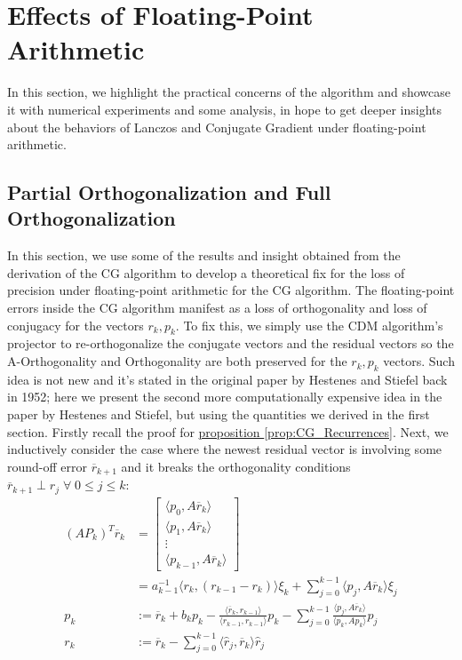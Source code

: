 \documentclass[]{article}
\theoremstyle{definition}
\begin{document}
\section{Effects of Floating-Point Arithmetic}
    In this section, we highlight the practical concerns of the algorithm and showcase it with numerical experiments and some analysis, in hope to get deeper insights about the behaviors of Lanczos and Conjugate Gradient under floating-point arithmetic. 
    \subsection{Partial Orthogonalization and Full Orthogonalization}
        In this section, we use some of the results and insight obtained from the derivation of the CG algorithm to develop a theoretical fix for the loss of precision under floating-point arithmetic for the CG algorithm. The floating-point errors inside the CG algorithm manifest as a loss of orthogonality and loss of conjugacy for the vectors $r_k, p_k$. To fix this, we simply use the CDM algorithm's projector to re-orthogonalize the conjugate vectors and the residual vectors so the A-Orthogonality and Orthogonality are both preserved for the $r_k, p_k$ vectors. Such idea is not new and it's stated in the original paper by Hestenes and Stiefel back in 1952\cite{paper:cg_original}; here we present the second more computationally expensive idea in the paper by Hestenes and Stiefel, but using the quantities we derived in the first section. Firstly recall the proof for \hyperref[prop:CG_Recurrences]{proposition \ref*{prop:CG_Recurrences}}. Next, we inductively consider the case where the newest residual vector is involving some round-off error $\overline{r}_{k + 1}$ and it breaks the orthogonality conditions $\overline{r}_{k + 1} \perp r_{j} \; \forall \; 0 \le j \le k$: 
        \begin{align}
            (AP_k)^T\overline{r}_k &= 
            \begin{bmatrix}
                \langle p_0, A\overline{r}_k\rangle
                \\
                \langle p_1, A\overline{r}_k\rangle
                \\
                \vdots
                \\
                \langle p_{k - 1}, A\overline{r}_k\rangle
            \end{bmatrix}
            \\
            & = 
            a_{k - 1}^{-1}\langle r_k, (r_{k - 1} - r_k)\rangle\xi_k + \sum_{j = 0}^{k - 1}\langle p_j, A\overline{r}_k\rangle \xi_j
            \\
            p_k &:= \overline{r}_k + b_kp_k - 
                \frac{\langle \overline{r}_k, r_{k -1}\rangle}{\langle r_{k - 1}, r_{k - 1}\rangle}p_k
            - \sum_{j = 0}^{k - 1}\frac{\langle p_j, A\overline{r}_k\rangle}{\langle p_k, Ap_k\rangle}p_j
            \\
            r_k &:= \overline{r}_k - \sum_{j = 0}^{k - 1} \langle \hat{r}_j,\overline{r}_k\rangle \hat{r}_j
        \end{align}
\end{document}
